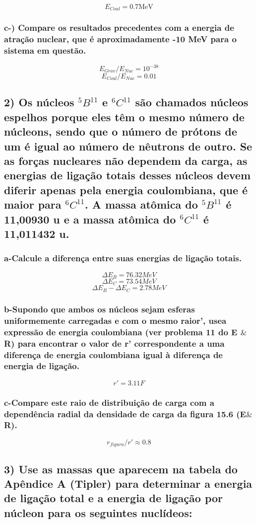 \documentclass{article}
\begin{document}
\[E_{Coul} = 0.7 \text{MeV}\]

\subsubsection*{ c-) Compare os resultados precedentes com a energia de atração nuclear, que é aproximadamente -10 MeV para o sistema em questão.}

\[E_{Grav}/E_{Nuc} = 10^{-38}\]
\[E_{Coul}/E_{Nuc} = 0.01\]

\subsection*{2) Os núcleos ${}^5B^{11}$ e ${}^6C^{11}$ são chamados núcleos espelhos porque eles têm o mesmo número de núcleons, sendo que o número de prótons de um é igual ao número de nêutrons de outro. Se as forças nucleares não dependem da carga, as energias de ligação totais desses núcleos devem diferir apenas pela energia coulombiana, que é maior para ${}^6C^{11}$. A massa atômica do ${}^5B^{11}$ é 11,00930 u e a massa atômica do ${}^6C^{11}$ é 11,011432 u.}

\subsubsection*{a-Calcule a diferença entre suas energias de ligação totais.}

\[\Delta E_B = 76.32 MeV\]
\[\Delta E_C = 73.54 MeV\]
\[\Delta E_B - \Delta E_C = 2.78 MeV\]

\subsubsection*{b-Supondo que ambos os núcleos sejam esferas uniformemente carregadas e com o mesmo raior’, usea expressão de energia coulombiana (ver problema 11 do E $\&$ R) para encontrar o valor de r’ correspondente a uma diferença de energia coulombiana igual à diferença de energia de ligação.}

\[r' = 3.11 F\]

\subsubsection*{c-Compare este raio de distribuição de carga com a dependência radial da densidade de carga da figura 15.6 (E$\&$R).}
\[r_{figura}/r' \approx 0.8\]


\pagebreak

\subsection*{3) Use as massas que aparecem na tabela do Apêndice A (Tipler) para determinar a energia de ligação total e a energia de ligação por núcleon para os seguintes nuclídeos:}
\end{document}
